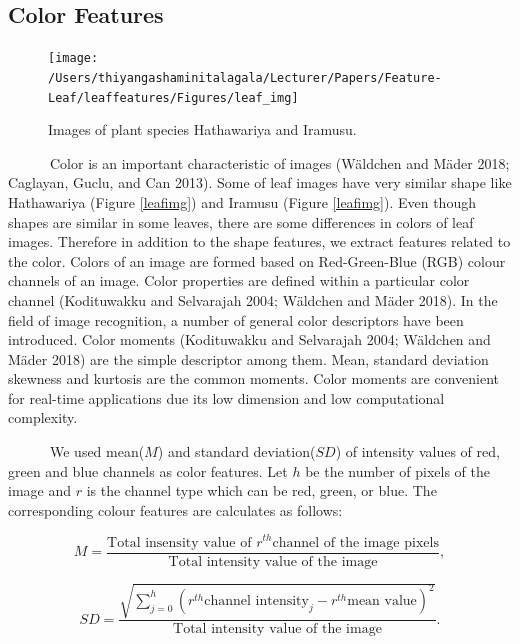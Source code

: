\documentclass{article}
\begin{document}
\hypertarget{color-features}{%
\subsection{Color Features}\label{color-features}}

\begin{figure}[!ht]

{\centering \texttt{[image: /Users/thiyangashaminitalagala/Lecturer/Papers/Feature-Leaf/leaffeatures/Figures/leaf\_img]} 

}

\caption{\label{leafimg} Images of plant species Hathawariya and Iramusu.}\label{fig:unnamed-chunk-12}
\end{figure}

~~~~~~Color is an important characteristic of images (Wäldchen and Mäder
2018; Caglayan, Guclu, and Can 2013). Some of leaf images have very
similar shape like Hathawariya (Figure \ref{leafimg}) and Iramusu
(Figure \ref{leafimg}). Even though shapes are similar in some leaves,
there are some differences in colors of leaf images. Therefore in
addition to the shape features, we extract features related to the
color. Colors of an image are formed based on Red-Green-Blue (RGB)
colour channels of an image. Color properties are defined within a
particular color channel (Kodituwakku and Selvarajah 2004; Wäldchen and
Mäder 2018). In the field of image recognition, a number of general
color descriptors have been introduced. Color moments (Kodituwakku and
Selvarajah 2004; Wäldchen and Mäder 2018) are the simple descriptor
among them. Mean, standard deviation skewness and kurtosis are the
common moments. Color moments are convenient for real-time applications
due its low dimension and low computational complexity.

~~~~~~We used mean(\(M\)) and standard deviation(\(SD\)) of intensity
values of red, green and blue channels as color features. Let \(h\) be
the number of pixels of the image and \(r\) is the channel type which
can be red, green, or blue. The corresponding colour features are
calculates as follows:

\begin{equation}
    M = \frac{\text{Total insensity value of } r^{th} \text{channel of the image pixels}}{\text{Total intensity value of the image}},
\label{equa2}
\end{equation}

\begin{equation}
    SD = \frac{\sqrt{\sum_{j=0}^{h}(r^{th} \text{channel intensity}_j - r^{th} \text{mean value})^2}}{\text{Total intensity value of the image}}.
\label{equa3}
\end{equation}
\end{document}
